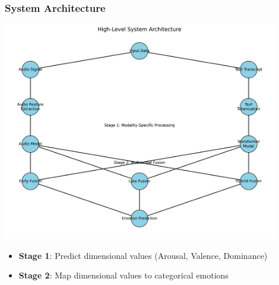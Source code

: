 \documentclass{beamer}
\begin{document}
\begin{frame}
\frametitle{System Architecture}
\begin{center}
\includegraphics[width=0.9\textwidth]{figures/system_architecture.png}
\end{center}

\begin{itemize}
    \item \textbf{Stage 1}: Predict dimensional values (Arousal, Valence, Dominance)
    \item \textbf{Stage 2}: Map dimensional values to categorical emotions
\end{itemize}
\end{frame}
\end{document}
